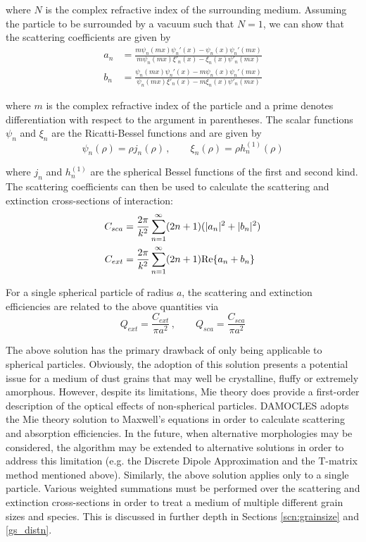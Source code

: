 \noindent where $N$ is the complex refractive index of the surrounding medium.  Assuming the particle to be surrounded by a vacuum such that $N=1$, we can show that the scattering coefficients are given by 
\begin{align}
a_n &= \frac{m\psi_n(mx)\psi_n'(x)-\psi_n(x)\psi_n'(mx)}{m\psi_n(mx)\xi'_n(x)-\xi_n(x)\psi'_n(mx)} \\[2ex]
b_n &= \frac{\psi_n(mx)\psi_n'(x)-m\psi_n(x)\psi_n'(mx)}{\psi_n(mx)\xi'_n(x)-m\xi_n(x)\psi'_n(mx)}
\end{align}


\noindent where $m$ is the complex refractive index of the particle and a prime denotes differentiation with respect to the argument in parentheses. The scalar functions $\psi_n$ and $\xi_n$ are the Ricatti-Bessel functions and are given by
\begin{equation}
\psi_n(\rho) = \rho j_n(\rho) \, , \quad \quad \xi_n(\rho)=\rho h_n^{(1)}(\rho)
\end{equation}

\noindent where $j_n$ and $h_n^{(1)}$ are the spherical Bessel functions of the first and second kind.  The scattering coefficients can then be used to calculate the scattering and extinction cross-sections of interaction:
\begin{align}
C_{sca}&=\frac{2\pi}{k^2}\sum_{n=1}^{\infty} (2n+1)(|a_n|^2+|b_n|^2) \\
C_{ext}&=\frac{2\pi}{k^2}\sum_{n=1}^{\infty} (2n+1)\textnormal{Re}\{a_n+b_n\} 
\end{align}

For a single spherical particle of radius $a$, the scattering and extinction efficiencies are related to the above quantities via
\begin{equation}
Q_{ext}=\frac{C_{ext}}{\pi a^2}\, , \quad \quad Q_{sca}=\frac{C_{sca}}{\pi a^2}
\end{equation}

The above solution has the primary drawback of only being applicable to spherical particles.  Obviously, the adoption of this solution presents a potential issue for a medium of dust grains that may well be crystalline, fluffy or extremely amorphous.  However, despite its limitations, Mie theory does provide a first-order description of the optical effects of non-spherical particles.  DAMOCLES adopts the Mie theory solution to Maxwell's equations in order to calculate scattering and absorption efficiencies.  In the future, when alternative morphologies may be considered, the algorithm may be extended to alternative solutions  in order to address this limitation (e.g. the Discrete Dipole Approximation and the T-matrix method mentioned above).  Similarly, the above solution applies only to a single particle.  Various weighted summations must be performed over the scattering and extinction cross-sections in order to treat a medium of multiple different grain sizes and species.  This is discussed in further depth in Sections \ref{scn:grainsize} and \ref{gs_distn}.

